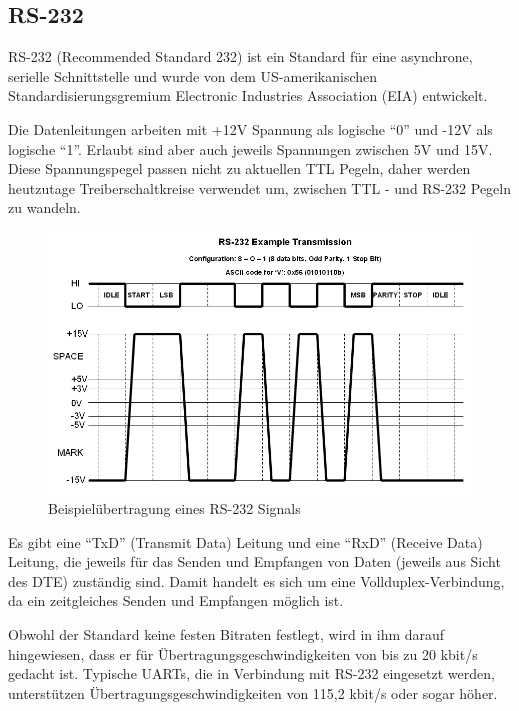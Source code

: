 \subsection{RS-232}
RS-232 (Recommended Standard 232) ist ein Standard für eine asynchrone, serielle Schnittstelle und wurde
von dem US-amerikanischen Standardisierungsgremium Electronic Industries Association (EIA) entwickelt.

Die Datenleitungen arbeiten mit +12V Spannung als logische \enquote{0} und -12V als logische \enquote{1}.
Erlaubt sind aber auch jeweils Spannungen zwischen 5V und 15V. Diese Spannungspegel passen nicht zu
aktuellen \ac{TTL} Pegeln, daher werden heutzutage Treiberschaltkreise verwendet um, zwischen
\ac{TTL} - und RS-232 Pegeln zu wandeln.
\begin{figure}[H]
    \centering
    \includegraphics[width=1\textwidth]{resources/images/rs232_example.png}
    \caption[RS-232 Beispiel]{Beispielübertragung eines RS-232 Signals \cite{ser-example}}
    \label{fig:RS232}
\end{figure}

Es gibt eine \enquote{TxD} (Transmit Data) Leitung und eine \enquote{RxD} (Receive Data) Leitung, die
jeweils für das Senden und Empfangen von Daten (jeweils aus Sicht des \ac{DTE}) zuständig sind.
Damit handelt es sich um eine  Vollduplex-Verbindung, da ein zeitgleiches Senden und Empfangen möglich ist.

Obwohl der Standard keine festen Bitraten festlegt, wird in ihm darauf hingewiesen, dass er für
Übertragungsgeschwindigkeiten von bis zu 20 kbit/s gedacht ist. Typische \acp{UART}, die in Verbindung mit
RS-232 eingesetzt werden, unterstützen Übertragungsgeschwindigkeiten von 115,2 kbit/s oder sogar höher.

